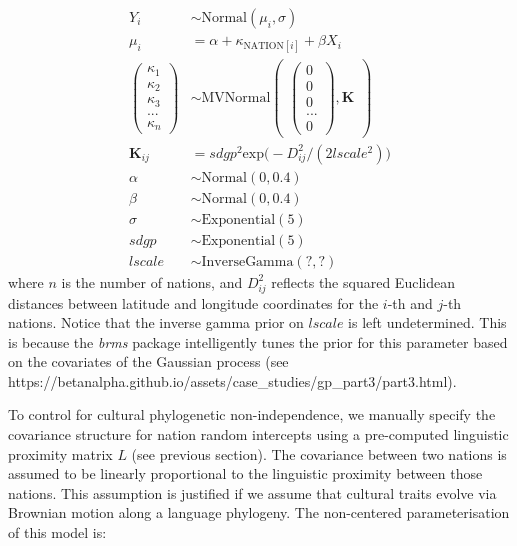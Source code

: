 \documentclass[
  english,
  man,floatsintext]{apa6}
\begin{document}
\begin{appendix}
\[
\begin{aligned}
Y_{i} &\sim \text{Normal}(\mu_{i},\sigma) \\
\mu_{i} &= \alpha + \kappa_{\text{NATION}[i]} + \beta X_{i} \\
\begin{pmatrix}
\kappa_{1} \\ \kappa_{2} \\ \kappa_{3} \\ ... \\ \kappa_{n}
\end{pmatrix} &\sim \text{MVNormal}
\begin{pmatrix}
\begin{pmatrix}
0 \\ 0 \\ 0 \\ ... \\ 0
\end{pmatrix},\textbf{K}
\end{pmatrix}\\
\textbf{K}_{ij} &= sdgp^2 \text{exp} \big (-D_{ij}^2 / (2 lscale^2) \big )\\
\alpha &\sim \text{Normal}(0, 0.4) \\
\beta &\sim \text{Normal}(0, 0.4) \\
\sigma &\sim \text{Exponential}(5) \\
sdgp &\sim \text{Exponential}(5) \\
lscale &\sim \text{InverseGamma}(?,?)
\end{aligned}
\] where \(n\) is the number of nations, and \(D^2_{ij}\) reflects the
squared Euclidean distances between latitude and longitude coordinates
for the \(i\)-th and \(j\)-th nations. Notice that the inverse gamma
prior on \(lscale\) is left undetermined. This is because the
\emph{brms} package intelligently tunes the prior for this parameter
based on the covariates of the Gaussian process (see
https://betanalpha.github.io/assets/case\_studies/gp\_part3/part3.html).

\newpage

To control for cultural phylogenetic non-independence, we manually
specify the covariance structure for nation random intercepts using a
pre-computed linguistic proximity matrix \(L\) (see previous section).
The covariance between two nations is assumed to be linearly
proportional to the linguistic proximity between those nations. This
assumption is justified if we assume that cultural traits evolve via
Brownian motion along a language phylogeny. The non-centered
parameterisation of this model is:


\end{appendix}
\end{document}
